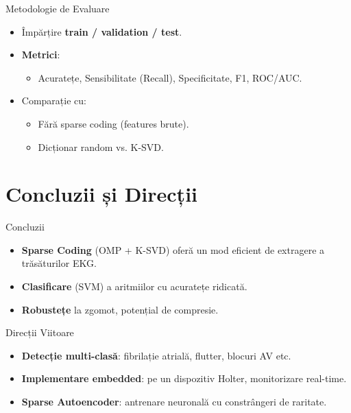 \documentclass[aspectratio=169,xcolor=dvipsnames]{beamer}
\begin{document}
\begin{frame}{Metodologie de Evaluare}
  \begin{itemize}
    \item Împărțire \textbf{train / validation / test}.
    \item \textbf{Metrici}: 
    \begin{itemize}
      \item Acuratețe, Sensibilitate (Recall), Specificitate, F1, ROC/AUC.
    \end{itemize}
    \item Comparație cu:
      \begin{itemize}
        \item Fără sparse coding (features brute).
        \item Dicționar random vs. K-SVD.
      \end{itemize}
  \end{itemize}
\end{frame}

\section{Concluzii și Direcții}

\begin{frame}{Concluzii}
  \begin{itemize}
    \item \textbf{Sparse Coding} (OMP + K-SVD) oferă un mod eficient de extragere a trăsăturilor EKG.
    \item \textbf{Clasificare} (SVM) a aritmiilor cu acuratețe ridicată.
    \item \textbf{Robustețe} la zgomot, potențial de compresie.
  \end{itemize}
\end{frame}

\begin{frame}{Direcții Viitoare}
  \begin{itemize}
    \item \textbf{Detecție multi-clasă}: fibrilație atrială, flutter, blocuri AV etc.
    \item \textbf{Implementare embedded}: pe un dispozitiv Holter, monitorizare real-time.
    \item \textbf{Sparse Autoencoder}: antrenare neuronală cu constrângeri de raritate.
  \end{itemize}
\end{frame}
\end{document}
